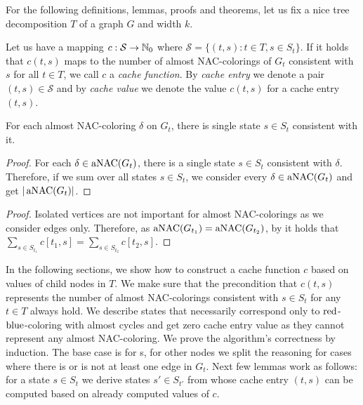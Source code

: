 For the following definitions, lemmas, proofs and theorems, let us fix
a nice tree decomposition \( T \) of a graph \( G \) and width \( k \).
%
\begin{definition}
	Let us have a mapping \( c: \mathcal{S} \to \mathbb{N}_0 \)
	where \( \mathcal{S} = \{ (t,s): t \in T, s \in S_t \} \).
	If it holds that \( c(t, s) \) maps to the number of almost NAC-colorings of \( G_t \)
	consistent with \( s \) for all \( t \in T \),
	we call \( c \) a \emph{cache function}.
	By \emph{cache entry} we denote a pair \( (t, s) \in \mathcal{S} \) and
	by \emph{cache value} we denote the value \( c(t, s) \) for a cache entry \( (t, s) \).
\end{definition}
%
%
\begin{observation}
	For each almost NAC-coloring \( \delta \) on \( G_t \),
	there is single state \( s \in S_t \) consistent with it.
\end{observation}
%
%
%
\begin{proof}
	For each \( \delta \in \operatorname{aNAC}(G_t) \),
	there is a single state \( s \in S_t \) consistent with \( \delta \).
	Therefore, if we sum over all states \( s \in S_t \),
	we consider every \( \delta \in \operatorname{aNAC}(G_t) \) and get \( |\operatorname{aNAC}(G_t)| \).
\end{proof}
%
%
\begin{proof}
	Isolated vertices are not important for almost NAC-colorings
	as we consider edges only.
	Therefore, as \( \operatorname{aNAC}(G_{t_1}) = \operatorname{aNAC}(G_{t_2}) \),
	by 
	it holds that \( \sum_{s \in S_{t_1}} c[t_1, s] = \sum_{s \in S_{t_2}} c[t_2, s] \).
\end{proof}
%

In the following sections,
we show how to construct a cache function \( c \)
based on values of child nodes in \( T \).
We make sure that the precondition that \( c(t, s) \) represents the number of almost NAC-colorings
consistent with \( s \in S_t \) for any \( t \in T  \) always hold.
We describe states that necessarily correspond only
to \( \text{red} \)-\( \text{blue} \)-coloring with  almost cycles and
get zero cache entry value as they cannot represent any almost NAC-coloring.
We prove the algorithm's correctness by induction.
The base case is for \LeafNode{}s, for other nodes we split the reasoning for cases where
there is or is not at least one edge in \( G_t \).
Next few lemmas work as follows: for a state \( s \in S_t \)
we derive states \( s' \in S_{t'} \) from whose cache entry \( (t, s) \)
can be computed based on already computed values of \( c \).

